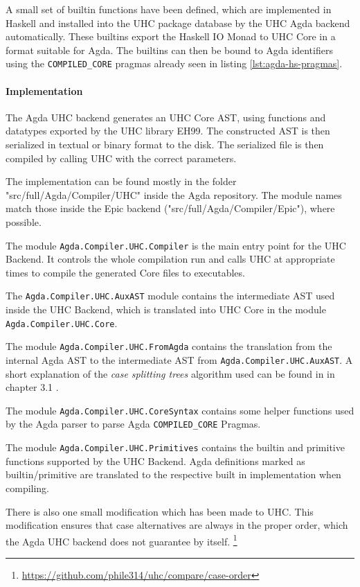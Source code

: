 \documentclass[12pt, a4paper, twoside]{report}
\begin{document}
A small set of builtin functions have been defined, which are implemented in Haskell
and installed into the UHC package database by the UHC Agda backend automatically. These
builtins export the Haskell IO Monad to UHC Core in a format suitable for Agda.
The builtins can then be bound to Agda identifiers using the \texttt{COMPILED_CORE} pragmas
already seen in listing \ref{lst:agda-hs-pragmas}.


\paragraph{Implementation}
The Agda UHC backend generates an UHC Core AST, using functions and datatypes exported
by the UHC library EH99. The constructed AST is then serialized in textual or binary format
to the disk. The serialized file is then compiled by calling UHC with the correct parameters.

The implementation can be found mostly in the folder "src/full/Agda/Compiler/UHC" inside
the Agda repository. The module
names match those inside the Epic backend ("src/full/Agda/Compiler/Epic"), where possible.

The module \texttt{Agda.Compiler.UHC.Compiler} is the main entry point for the UHC Backend.
It controls the whole compilation run and calls UHC at appropriate times to compile the
generated Core files to executables.

The \texttt{Agda.Compiler.UHC.AuxAST} module contains the intermediate AST used inside the UHC Backend,
which is translated into UHC Core in the module \texttt{Agda.Compiler.UHC.Core}.

The module \texttt{Agda.Compiler.UHC.FromAgda} contains the translation from the internal Agda AST
to the intermediate AST from \texttt{Agda.Compiler.UHC.AuxAST}. A short explanation
of the \emph{case splitting trees} algorithm used can be found in \cite{fredriksson2011totaly} in chapter 3.1 .

The module \texttt{Agda.Compiler.UHC.CoreSyntax} contains some helper functions used by
the Agda parser to parse Agda \texttt{COMPILED_CORE} Pragmas.

The module \texttt{Agda.Compiler.UHC.Primitives} contains the builtin and primitive functions
supported by the UHC Backend. Agda definitions marked as builtin/primitive are translated
to the respective built in implementation when compiling.

There is also one small modification which has been made to UHC. This modification
ensures that case alternatives are always in the proper order, which the Agda UHC backend
does not guarantee by itself. \footnote{\url{https://github.com/phile314/uhc/compare/case-order}}
\end{document}
